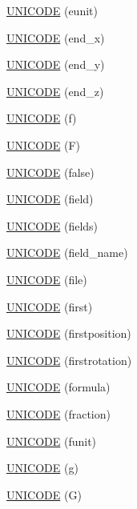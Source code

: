 \begin{DoxyCompactItemize}
\item 
\hyperlink{namespace_d_d4hep_1_1_x_m_l_ae3b540d035bb70cc7b5bbcc83dd6e5e7}{UNICODE} (eunit)
\item 
\hyperlink{namespace_d_d4hep_1_1_x_m_l_ad66d24eb24d6f2b7e423bd83673a2f3f}{UNICODE} (end\_\-x)
\item 
\hyperlink{namespace_d_d4hep_1_1_x_m_l_a03bba48af937c9c678afd85d1340fab9}{UNICODE} (end\_\-y)
\item 
\hyperlink{namespace_d_d4hep_1_1_x_m_l_a634a3a5c2933f3a4c80378890aa22a58}{UNICODE} (end\_\-z)
\item 
\hyperlink{namespace_d_d4hep_1_1_x_m_l_adc297351330354fec9592f11f7c767aa}{UNICODE} (f)
\item 
\hyperlink{namespace_d_d4hep_1_1_x_m_l_a5f083cc6152ec884623bb2c62bf1cd69}{UNICODE} (F)
\item 
\hyperlink{namespace_d_d4hep_1_1_x_m_l_a2267483060419643154ae147a414f968}{UNICODE} (false)
\item 
\hyperlink{namespace_d_d4hep_1_1_x_m_l_ae1a9c1ee7a5bef7958dd5dad3728ac79}{UNICODE} (field)
\item 
\hyperlink{namespace_d_d4hep_1_1_x_m_l_ae0c92c81b03134307593eb2a6561764a}{UNICODE} (fields)
\item 
\hyperlink{namespace_d_d4hep_1_1_x_m_l_a1230bf8cd34b5bc768384fa689b4d4fc}{UNICODE} (field\_\-name)
\item 
\hyperlink{namespace_d_d4hep_1_1_x_m_l_a6ef220c00df7ac52924e11ac861be82c}{UNICODE} (file)
\item 
\hyperlink{namespace_d_d4hep_1_1_x_m_l_ac80613f906cf63517d64418efa954e0a}{UNICODE} (first)
\item 
\hyperlink{namespace_d_d4hep_1_1_x_m_l_a791bf013a10eb51d4327337998549933}{UNICODE} (firstposition)
\item 
\hyperlink{namespace_d_d4hep_1_1_x_m_l_ab0b2ec7402a741cd3861fcda7ac070e7}{UNICODE} (firstrotation)
\item 
\hyperlink{namespace_d_d4hep_1_1_x_m_l_aacac9785fd2df652653df6b5d88ae188}{UNICODE} (formula)
\item 
\hyperlink{namespace_d_d4hep_1_1_x_m_l_af2a0921e72853c1f4486576ca5faa8c9}{UNICODE} (fraction)
\item 
\hyperlink{namespace_d_d4hep_1_1_x_m_l_ac7baee28e83ec35385467b2a43fcb315}{UNICODE} (funit)
\item 
\hyperlink{namespace_d_d4hep_1_1_x_m_l_a19db2e310efabcda642e944156397a3e}{UNICODE} (g)
\item 
\hyperlink{namespace_d_d4hep_1_1_x_m_l_a7e38c23f958dbd4dd72132258415089a}{UNICODE} (G)

\end{DoxyCompactItemize}
